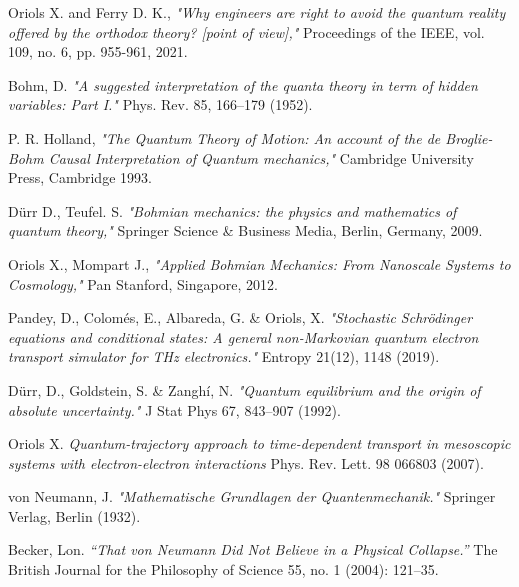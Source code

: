 \documentclass[11pt, a4paper]{article} %
\begin{document}
\newpage
\begin{thebibliography}{1}
{\footnotesize 

Oriols X. and Ferry D. K., {\em "Why engineers are right to avoid the quantum reality offered by the orthodox theory? [point of view],"} Proceedings of the IEEE, vol. 109, no. 6, pp. 955-961, 2021.

Bohm, D. {\em "A suggested interpretation of the quanta theory in term of hidden variables: Part I."} Phys. Rev. 85, 166–179 (1952).

P. R. Holland, {\em "The Quantum Theory of Motion: An account of the de Broglie-Bohm Causal Interpretation of Quantum
mechanics,"} Cambridge University Press, Cambridge 1993.

Dürr D., Teufel. S. {\em "Bohmian mechanics: the physics and mathematics of quantum theory,"} Springer Science \& Business Media, Berlin, Germany, 2009.

	Oriols X., Mompart J., {\em "Applied Bohmian Mechanics: From Nanoscale Systems to Cosmology,"} Pan Stanford, Singapore, 2012.
	
Pandey, D., Colomés, E., Albareda, G. \& Oriols, X. {\em "Stochastic Schrödinger equations and conditional states: A general non-Markovian quantum electron transport simulator for THz electronics."} Entropy 21(12), 1148 (2019).

Dürr, D., Goldstein, S. \& Zanghí, N. {\em "Quantum equilibrium and the origin of absolute uncertainty."} J Stat Phys 67, 843–907 (1992).

Oriols X. {\em Quantum-trajectory approach to time-dependent transport in mesoscopic systems with electron-electron interactions} Phys. Rev. Lett. 98 066803 (2007).


von Neumann, J. {\em "Mathematische Grundlagen der Quantenmechanik."} Springer Verlag, Berlin (1932).

Becker, Lon. {\em “That von Neumann Did Not Believe in a Physical Collapse.”} The British Journal for the Philosophy of Science 55, no. 1 (2004): 121–35.


}
\end{thebibliography}
\end{document}
